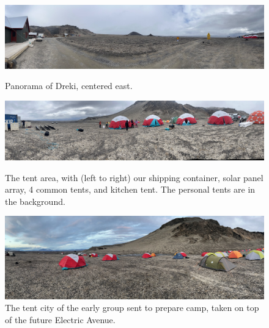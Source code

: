 \begin{figure}
	\centering
	\includegraphics[width=\textwidth]{./images/dreki.jpg}
	\caption{Panorama of Dreki, centered east.}
	\label{figure:dreki_panorama}
	\includegraphics[width=\textwidth]{./images/common_tents.jpg}
	\caption{The tent area, with (left to right) our shipping container, solar panel array,
	4 common tents, and kitchen tent. The personal tents are in the background.}
	\label{figure:common_tents}
	\includegraphics[width=\textwidth]{./images/personal_tents.jpg}
	\caption{The tent city of the early group sent to prepare camp, taken on top of the future Electric Avenue.}
	\label{figure:personal_tent_city}
\end{figure}
